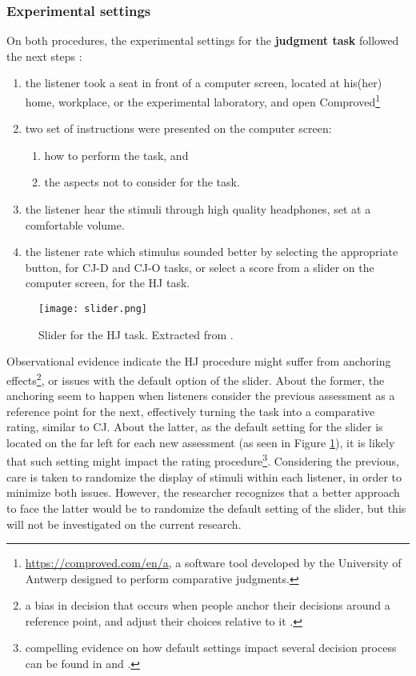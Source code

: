 \subsubsection{Experimental settings} \label{ss_sect:expset}
%
On both procedures, the experimental settings for the \textbf{judgment task} followed the next steps \citep{Boonen_et_al_2020, Boonen_et_al_2021}:
%
\begin{enumerate}
	\item the listener took a seat in front of a computer screen, located at his(her) home, workplace, or the experimental laboratory, and open Comproved\footnote{\url{https://comproved.com/en/a}, a software tool developed by the University of Antwerp designed to perform comparative judgments.}
	\item two set of instructions were presented on the computer screen:
	\begin{enumerate}
		\item how to perform the task, and
		\item the aspects not to consider for the task.
	\end{enumerate}
	\item the listener hear the stimuli through high quality headphones, set at a comfortable volume.
	\item the listener rate which stimulus sounded better by selecting the appropriate button, for CJ-D and CJ-O tasks, or select a score from a slider on the computer screen, for the HJ task.
\end{enumerate}
%
\begin{figure}[h]
	\centering
	\texttt{[image: slider.png]}
	\caption[Slider for the HJ task.]%
	{Slider for the HJ task. Extracted from \citet{Boonen_et_al_2021}.}
	\label{fig:slider}
\end{figure}
%
Observational evidence indicate the HJ procedure might suffer from anchoring effects\footnote{a bias in decision that occurs when people anchor their decisions around a reference point, and adjust their choices relative to it \cite{Baddeley_2017, Kahneman_2013}.}, or issues with the default option of the slider. About the former, the anchoring seem to happen when listeners consider the previous assessment as a reference point for the next, effectively turning the task into a comparative rating, similar to CJ. About the latter, as the default setting for the slider is located on the far left for each new assessment (as seen in Figure \ref{fig:slider}), it is likely that such setting might impact the rating procedure\footnote{compelling evidence on how default settings impact several decision process can be found in \citet{Kahneman_2013} and \citet{Johnson_et_al_2003}.}. Considering the previous, care is taken to randomize the display of stimuli within each listener, in order to minimize both issues. However, the researcher recognizes that a better approach to face the latter would be to randomize the default setting of the slider, but this will not be investigated on the current research. 

